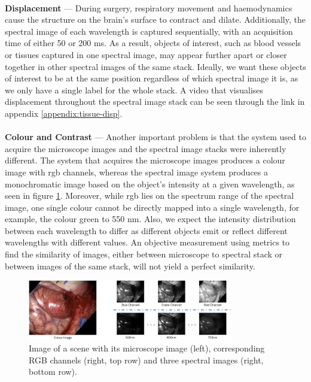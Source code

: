 \documentclass[12pt,oneside]{report}
\begin{document}
\paragraph{}
\textbf{Displacement} --- During surgery, respiratory movement and haemodynamics cause the structure on the brain's surface to contract and dilate. Additionally, the spectral image of each wavelength is captured sequentially, with an acquisition time of either 50 or 200 ms. As a result, objects of interest, such as blood vessels or tissues captured in one spectral image, may appear further apart or closer together in other spectral images of the same stack. Ideally, we want these objects of interest to be at the same position regardless of which spectral image it is, as we only have a single label for the whole stack. A video that visualises displacement throughout the spectral image stack can be seen through the link in appendix \ref{appendix:tissue-disp}.


\paragraph{}
\textbf{Colour and Contrast} --- Another important problem is that the system used to acquire the microscope images and the spectral image stacks were inherently different. The system that acquires the microscope images produces a colour image with \acrshort{rgb} channels, whereas the spectral image system produces a monochromatic image based on the object's intensity at a given wavelength, as seen in figure \ref{fig:colour-spectral}. Moreover, while \acrshort{rgb} lies on the spectrum range of the spectral image, one single colour cannot be directly mapped into a single wavelength, for example, the colour green to 550 nm. Also, we expect the intensity distribution between each wavelength to differ as different objects emit or reflect different wavelengths with different values. An objective measurement using metrics to find the similarity of images, either between microscope to spectral stack or between images of the same stack, will not yield a perfect similarity.

\begin{figure}[h]
\centering
\begin{minipage}[h]{\textwidth}
    \centering
    \includegraphics[width=0.8\textwidth]{figures/colour-spectral.png}
    \caption{Image of a scene with its microscope image (left), corresponding RGB channels (right, top row) and three spectral images (right, bottom row).}
    \label{fig:colour-spectral}
\end{minipage}
\end{figure}
\end{document}
